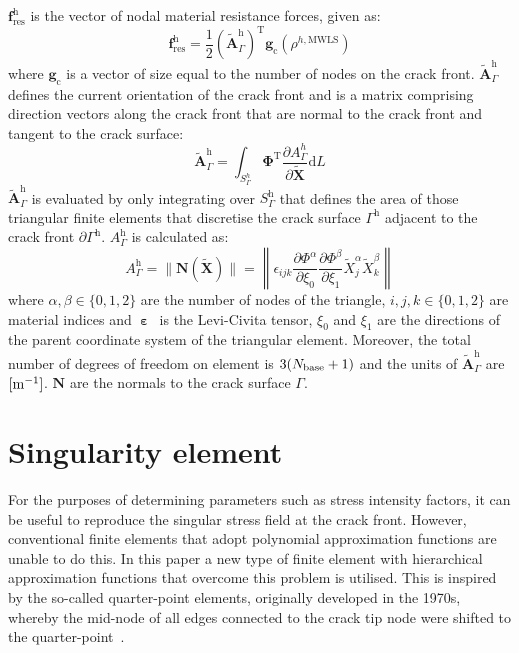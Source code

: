 \documentclass[twocolumn]{svjour3}
\begin{document}
$\mathbf{f}^\textrm{h}_\textrm{res}$ is the vector of nodal material resistance forces, given as:
\begin{equation}
\mathbf{f}^\textrm{h}_\textrm{res}=\frac{1}{2}\left(\tilde{\mathbf{A}}_\Gamma^\textrm{h}\right)^\textrm{T}\mathbf{g}_\textrm{c}(\rho^{h,\textrm{MWLS}})
\end{equation}
where $\mathbf{g}_\textrm{c}$ is a vector of size equal to the number of nodes on the crack front. $\tilde{\mathbf{A}}_\Gamma^\textrm{h}$ defines the current orientation of the crack front and is a matrix comprising direction vectors along the crack front that are normal to the crack front and tangent to the crack surface:
\begin{equation}
\tilde{\mathbf{A}}_\Gamma^\textrm{h} = 
\int_{S^h_\Gamma}
\pmb{\Phi}^\textrm{T} 
\frac{\partial {A}^h_{\Gamma}}{
\partial \tilde{\mathbf{X}}}
\textrm{d}L
\end{equation}
$\tilde{\mathbf{A}}_\Gamma^\textrm{h}$ is evaluated by only integrating over $S_\Gamma^\textrm{h}$ that defines the area of those triangular finite elements that discretise the crack surface $\Gamma^\textrm{h}$ adjacent to the crack front $\partial\Gamma^\textrm{h}$.
$A^\textrm{h}_{\Gamma}$ is calculated as:
\begin{equation}
A^\textrm{h}_{\Gamma} = 	
	\| \mathbf{N}(\tilde{\mathbf{X}}) \|
=
\left\| 
\epsilon_{ijk}
\frac{\partial \Phi^\alpha}{\partial \xi_0}  
\frac{\partial \Phi^\beta}{\partial \xi_1} 
\tilde{X}^\alpha_j
\tilde{X}^\beta_k
\right\|
\end{equation}
where $\alpha, \beta \in \{0, 1, 2\}$ are the number of nodes of the triangle,
$i,j,k \in \{0,1,2\}$ are material indices and $\boldsymbol{\upepsilon}$~is the Levi-Civita tensor, $\xi_0$ and $\xi_1$ are the directions of the parent coordinate system of the triangular element. 
Moreover, the total number of degrees of freedom on element is $3(N_{\rm{base}}+1)$ and the units of $\tilde{\mathbf{A}}_\Gamma^\textrm{h}$ are $[{\rm m}^{-1}]$. $\mathbf{N}$ are the normals to the crack surface $\Gamma$.


\section{Singularity element}
\label{sec:singularity}
For the purposes of determining parameters such as stress intensity factors, it can be useful to reproduce the singular stress field at the crack front. However, conventional finite elements that adopt polynomial approximation functions are unable to do this. 
In this paper a new type of finite element with hierarchical approximation functions that overcome this problem is utilised. This is inspired by the so-called quarter-point elements, originally developed in the 1970s, whereby the mid-node of all edges connected to the crack tip node were shifted to the quarter-point~\cite{barsoum1976use,henshell1975crack}. 
\end{document}
